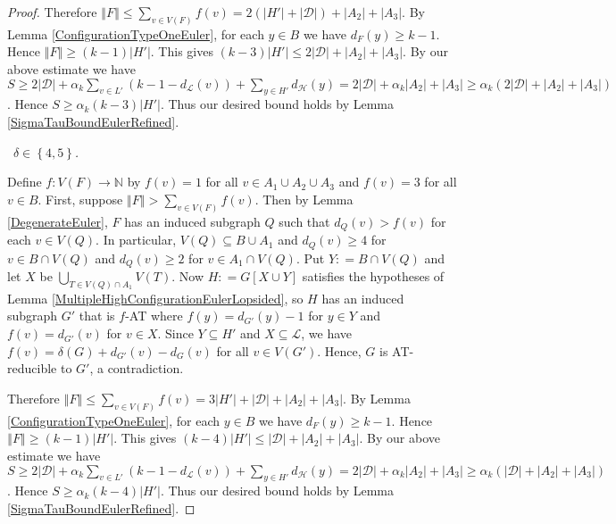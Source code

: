 \documentclass[12pt]{article}
\theoremstyle{plain}
\theoremstyle{definition}
\theoremstyle{remark}
\newcommand{\fancy}[1]{\mathcal{#1}}
\newcommand{\IN}{\mathbb{N}}
\newcommand{\D}{\fancy{D}}
\renewcommand{\L}{\fancy{L}}
\newcommand{\HH}{\fancy{H}}
\newcommand{\set}[1]{\left\{ #1 \right\}}
\newcommand{\card}[1]{\left|#1\right|}
\newcommand{\size}[1]{\left\Vert#1\right\Vert}
\newcommand{\func}[3]{#1\colon #2 \rightarrow #3}
\newcommand{\parens}[1]{\left( #1 \right)}
\newcommand{\DefinedAs}{\mathrel{\mathop:}=}
\def\D{\fancy{D}}
\newcommand{\case}[2]{{\bf Case #1.}~{\it #2}~~}
\begin{document}
\begin{proof}
Therefore $\size{F} \leq \sum_{v \in V(F)} f(v) = 2(\card{H'} + \card{\D}) + \card{A_2} + 
\card{A_3}$. By Lemma \ref{ConfigurationTypeOneEuler}, for each $y \in B$ we have $d_F(y) \ge k-1$.  Hence $\size{F} \ge (k-1)\card{H'}$.  This gives $(k-3)\card{H'} \leq 2\card{\D} + \card{A_2} + 
\card{A_3}$.  By our above estimate we have $S \ge 2\card{\D} + \alpha_k\sum_{v \in L'} \parens{k-1 - d_{\L}(v)}  + \sum_{y \in H'} d_{\HH}(y) = 2\card{\D} + \alpha_k\card{A_2} + \card{A_3} \ge \alpha_k(2\card{\D} + \card{A_2} + \card{A_3})$.  Hence $S \ge \alpha_k(k-3)\card{H'}$.  Thus our desired bound holds by Lemma \ref{SigmaTauBoundEulerRefined}.
\bigskip

\noindent \case{2}{$\delta \in \set{4,5}$.}
\smallskip

Define $\func{f}{V(F)}{\IN}$ by $f(v) = 1$ for all $v \in A_1 \cup A_2 \cup A_3$ and $f(v) = 3$ for all $v \in B$.  First, suppose $\size{F} > \sum_{v \in V(F)} f(v)$.  Then by Lemma \ref{DegenerateEuler}, $F$ has an induced subgraph $Q$ such that $d_Q(v) > f(v)$ for each $v \in V(Q)$.  In particular, $V(Q) \subseteq B \cup A_1$ and $d_Q(v) \ge 4$ for $v \in B \cap V(Q)$ and $d_Q(v) \ge 2$ for $v \in A_1 \cap V(Q)$.  Put $Y \DefinedAs B \cap V(Q)$ and let $X$ be $\bigcup_{T \in V(Q) \cap A_1} V(T)$. Now $H \DefinedAs G[X \cup Y]$ satisfies the hypotheses of Lemma \ref{MultipleHighConfigurationEulerLopsided}, so $H$ has an induced subgraph $G'$ that is $f$-AT where $f(y) = d_{G'}(y) - 1$ for $y \in Y$ and $f(v) = d_{G'}(v)$ for $v \in X$.  Since $Y \subseteq H'$ and $X \subseteq \L$, we have $f(v) = \delta(G) + d_{G'}(v) - d_G(v)$ for all $v \in V(G')$.  Hence, $G$ is AT-reducible to $G'$, a contradiction.

Therefore $\size{F} \leq \sum_{v \in V(F)} f(v) = 3\card{H'} + \card{\D} + \card{A_2} + 
\card{A_3}$. By Lemma \ref{ConfigurationTypeOneEuler}, for each $y \in B$ we have $d_F(y) \ge k-1$.  Hence $\size{F} \ge (k-1)\card{H'}$.  This gives $(k-4)\card{H'} \leq \card{\D} + \card{A_2} + 
\card{A_3}$.  By our above estimate we have $S \ge 2\card{\D} + \alpha_k\sum_{v \in L'} \parens{k-1 - d_{\L}(v)}  + \sum_{y \in H'} d_{\HH}(y) = 2\card{\D} + \alpha_k\card{A_2} + \card{A_3} \ge \alpha_k(\card{\D} + \card{A_2} + \card{A_3})$.  Hence $S \ge \alpha_k(k-4)\card{H'}$.  Thus our desired bound holds by Lemma \ref{SigmaTauBoundEulerRefined}.
\end{proof}



\end{document}
